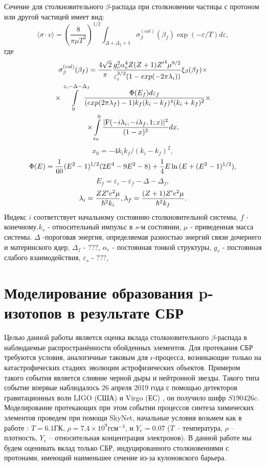 \documentclass[14pt, a4paper]{article}
\begin{document}
Сечение для столкновительного $\beta$-распада при столкновении частицы с протоном или другой частицей имеет вид:
\begin{equation} \label{sech}
\langle\sigma \cdot v\rangle = \left(\frac{8}{\pi\mu T^3}\right)^{1/2} \int_{\Delta + \Delta_f + 1} \sigma^{(col)}_\beta(\beta_f) \exp(-\varepsilon/T)d\varepsilon,
\end{equation}
где
\begin{multline} \label{sig}
\sigma^{(col)}_\beta(\beta_f)=
{4\sqrt{2}\over \pi} {{g^2_v\alpha_e^4Z (Z+1) {Z'}^4 \mu^{9/2}}
	\over{\varepsilon_i^{3/2} (1-exp(-2\pi\lambda_i))}}
\xi_\beta(\beta_f)
\times\\
\times\int\limits_0^{\varepsilon_i{-}\Delta{-}\Delta_f}\!\!\!\!\!
{{\Phi(E_f) d\varepsilon_f}\over{(exp(2\pi\lambda_f)-1)
		k_f ( k_i- k_f)^4(k_i+k_f)^2}}\times\\
\times\int\limits_{x_0}^0 {{|{\rm F}(-i \lambda_i, -i\lambda_f,1; x)|^2}\over{(1-x)^2}} dx,
\end{multline}
$$
x_0=-4 k_i k_f/(k_i- k_f)^2,
$$
$$
\Phi (E)={1\over 60}(E^2-1)^{1/2}(2E^4-9E^2-8)+{1\over 4}E\ln{(E+(E^2-1)^{1/2})},
$$
$$
E_f=\varepsilon_i-\varepsilon_f-\Delta-\Delta_f,
$$
$$
\lambda_i = {Z Z' e^2 \mu\over {\hbar}^2 k_i},
\lambda_f = {(Z+1) Z' e^2 \mu\over \hbar^2 k_f}.
$$
Индекс $i$ соответствует начальному состоянию столкновительной системы, $f$ - конечному.$k_s$ - относительный импульс в $s$-м состоянии, $\mu$ - приведенная масса системы. $\Delta$ -пороговая энергия, определяемая разностью энергий связи дочернего и материнского ядер, $\Delta_f$ - ???, $\alpha_e$ - постоянная тонкой структуры, $g_v$ - постоянная слабого взаимодействия, $\varepsilon_s$ - ???,


\section{Моделирование образования p-изотопов в результате СБР}

Целью данной работы является оценка вклада столкновительного $\beta$-распада в наблюдаемые распространённости обойденных элементов. Для протекания СБР требуются условия, аналогичные таковым для r-процесса, возникающие только на катастрофических стадиях эволюции астрофизических объектов. Примером такого события является слияние черной дыры и нейтронной звезды. Такого типа событие впервые наблюдалось 26 апреля 2019 года с помощью детекторов гравитационных волн LIGO (США) и Virgo (ЕС) \cite{Hosseinzadeh_2019}, он получило шифр $S190426c$. Моделирование протекающих при этом событии процессов синтеза химических элементов проведем при помощи SkyNet, начальные условия возьмем как в работе \cite{bhns}:  $T = 6.1 \text{ГК}$, $\rho = 7.4 \times 10^9 \text{г} \text{см}^{-3}$, и $Y_e = 0.07$ ($T$ -- температура, $\rho$ -- плотность, $Y_e$ -- относительная концентрация электронов). В данной работе мы будем оценивать вклад только СБР,  индуцированного столкновениями с протонами, имеющий наименьшее сечение из-за кулоновского барьера. 
\end{document}
